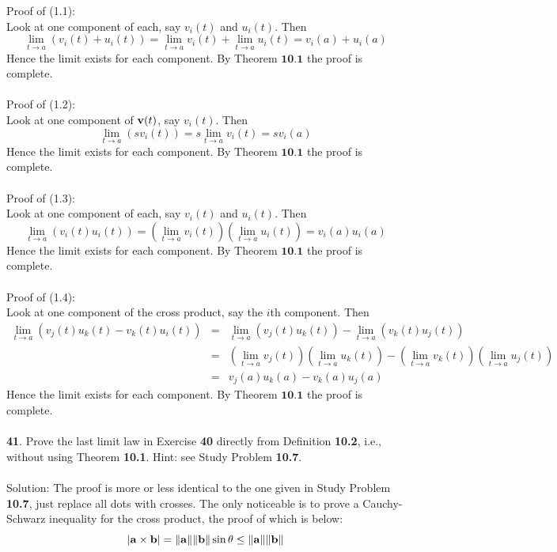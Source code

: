 \documentclass[12pt]{amsbook}
\begin{document}
\\
\\
Proof of (1.1):
\\
Look at one component of each, say $v_i(t)$ and $u_i(t)$. Then 
$$\lim_{t\rightarrow a}(v_i(t)+u_i(t))=\lim_{t\rightarrow a}v_i(t)+\lim_{t\rightarrow a}u_i(t)=v_i(a)+u_i(a)$$
Hence the limit exists for each component. By Theorem $\textbf{10.1}$ the proof is complete. 
\\
\\
Proof of (1.2):
\\
Look at one component of ${\bf v}(t)$, say $v_i(t)$. Then 
$$\lim_{t\rightarrow a}(sv_i(t))=s\lim_{t\rightarrow a}v_i(t)=sv_i(a)$$
Hence the limit exists for each component. By Theorem $\textbf{10.1}$ the proof is complete.
\\
\\
Proof of (1.3):
\\
Look at one component of each, say $v_i(t)$ and $u_i(t)$. Then 
$$\lim_{t\rightarrow a}(v_i(t)u_i(t))=(\lim_{t\rightarrow a}v_i(t))(\lim_{t\rightarrow a}u_i(t))=v_i(a)u_i(a)$$
Hence the limit exists for each component. By Theorem $\textbf{10.1}$ the proof is complete. 
\\
\\
Proof of (1.4):
\\
Look at one component of the cross product, say the $i$th component. Then 
\begin{eqnarray*}
\lim_{t\rightarrow a}(v_j(t)u_k(t)-v_k(t)u_i(t))&=&\lim_{t\rightarrow a}(v_j(t)u_k(t))-\lim_{t\rightarrow a}(v_k(t)u_j(t))\\
&=&(\lim_{t\rightarrow a}v_j(t))(\lim_{t\rightarrow a}u_k(t))-(\lim_{t\rightarrow a}v_k(t))(\lim_{t\rightarrow a}u_j(t))\\
&=&v_j(a)u_k(a)-v_k(a)u_j(a)
\end{eqnarray*}
Hence the limit exists for each component. By Theorem $\textbf{10.1}$ the proof is complete. 
\\
\\
{\small\bf 41}. Prove the last limit law in Exercise {\bf 40} directly from Definition {\bf 10.2}, i.e.,
without using Theorem {\bf 10.1}. Hint: see Study Problem {\bf 10.7}.
\\
\\
{\sc Solution}: The proof is more or less identical to the one given in Study Problem {\bf 10.7}, just replace all dots with crosses. The only noticeable is to prove a Cauchy-Schwarz inequality for the cross product, the proof of which is below:
$$|{\bf a}\times{\bf b}|=\|{\bf a}\|\|{\bf b}\|\sin \theta \leq \|{\bf a}\| \| {\bf b}\|$$
\end{document}
